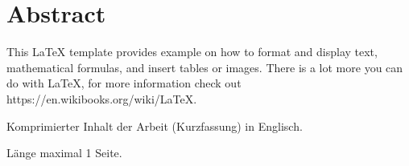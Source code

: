 \chapter{Abstract}
		This \LaTeX{} template provides example on how to format and display text, 
		mathematical formulas, and insert tables or images. There is a lot more you 
		can do with \LaTeX{}, for more information check out https://en.wikibooks.org/wiki/LaTeX.

Komprimierter Inhalt der Arbeit (Kurzfassung) in Englisch. 

Länge maximal 1 Seite. 

\lipsum[2-4]